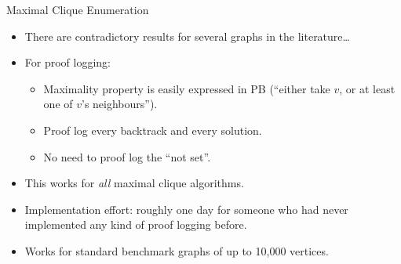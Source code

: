 \documentclass{beamer}
\begin{document}
\begin{frame}{Maximal Clique Enumeration}
    \begin{itemize}
        \item There are contradictory results for several graphs in the literature\ldots
        \item For proof logging:
            \begin{itemize}
                \item Maximality property is easily expressed in PB (``either take $v$, or at least
                    one of $v$'s neighbours'').
                \item Proof log every backtrack and every solution.
                \item No need to proof log the ``not set''.
            \end{itemize}
        \item This works for \emph{all} maximal clique algorithms.
        \item Implementation effort: roughly one day for someone who had never implemented
            any kind of proof logging before.
        \item Works for standard benchmark graphs of up to 10,000 vertices.
    \end{itemize}
\end{frame}
\end{document}
